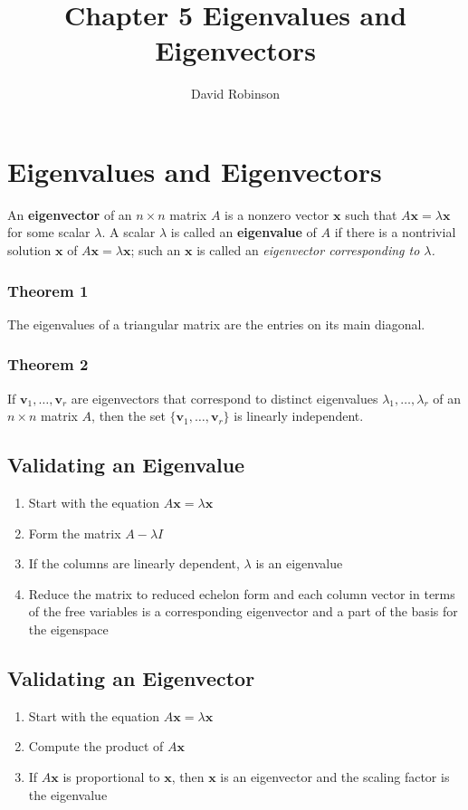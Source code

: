 \documentclass{article}
\title{Chapter 5 Eigenvalues and Eigenvectors}
\author{David Robinson}
\date{}
\begin{document}
\maketitle

\section*{Eigenvalues and Eigenvectors}

An \textbf{eigenvector} of an $n\times n$ matrix $A$ is a nonzero vector $\mathbf{x}$ such that
$A\mathbf{x}=\lambda\mathbf{x}$ for some scalar $\lambda$. A scalar $\lambda$ is called an
\textbf{eigenvalue} of $A$ if there is a nontrivial solution $\mathbf{x}$ of
$A\mathbf{x}=\lambda\mathbf{x}$; such an $\mathbf{x}$ is called an
\textit{eigenvector corresponding to $\lambda$.}

\subsubsection*{Theorem 1}
The eigenvalues of a triangular matrix are the entries on its main diagonal.

\subsubsection*{Theorem 2}
If $\mathbf{v}_1, \ldots, \mathbf{v}_r$ are eigenvectors that correspond to distinct eigenvalues
$\lambda_1, \ldots, \lambda_r$ of an $n\times n$ matrix $A$, then the set
$\{\mathbf{v}_1, \ldots, \mathbf{v}_r\}$ is linearly independent.

\subsection*{Validating an Eigenvalue}
\begin{enumerate}
    \item Start with the equation $A\mathbf{x}=\lambda \mathbf{x}$
    \item Form the matrix $A-\lambda I$
    \item If the columns are linearly dependent, $\lambda$ is an eigenvalue
    \item Reduce the matrix to reduced echelon form and each column vector in terms of the free
    variables is a corresponding eigenvector and a part of the basis for the eigenspace
\end{enumerate}

\subsection*{Validating an Eigenvector}
\begin{enumerate}
    \item Start with the equation $A\mathbf{x}=\lambda\mathbf{x}$
    \item Compute the product of $A\mathbf{x}$
    \item If $A\mathbf{x}$ is proportional to $\mathbf{x}$, then $\mathbf{x}$ is an eigenvector and
    the scaling factor is the eigenvalue
\end{enumerate}
\end{document}
